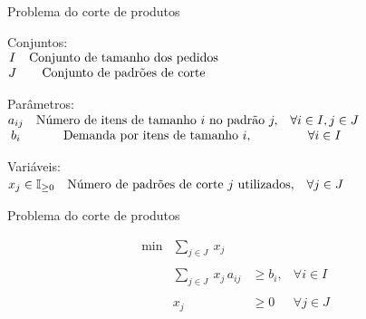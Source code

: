 \documentclass[compress,mathserif]{beamer}
\begin{document}
\begin{frame}{Problema do corte de produtos}

Conjuntos: \\
\vspace{0.2cm}
$\begin{matrix}
I & \textnormal{Conjunto de tamanho dos pedidos} \\
J & \textnormal{Conjunto de padrões de corte}
\end{matrix} 
$

\vspace{1cm}

Parâmetros: \\
\vspace{0.2cm}
$\begin{matrix}
a_{ij} & \textnormal{Número de itens de tamanho } i \textnormal{ no padrão } j, & \forall i \in I, j \in J\\
b_i & \textnormal{Demanda por itens de tamanho } i, & \forall i \in I
\end{matrix}
$

\vspace{1cm}

Variáveis: \\
\vspace{0.2cm}
$\begin{matrix}
x_j \in \mathbb{I}_{\geq 0} & \textnormal{Número de padrões de corte } j \textnormal{ utilizados}, & \forall j \in J
\end{matrix}
$

\end{frame}


\begin{frame}{Problema do corte de produtos}

$$\begin{matrix}
        \min & \sum_{j \in J}~x_j\\  \\
             & \sum_{j \in J}~x_j\,a_{ij} & \geq b_i, & \forall i \in I \\ \\
             & x_j & \geq 0 & \forall j \in J
        \end{matrix}    
$$

\end{frame}

\end{document}
